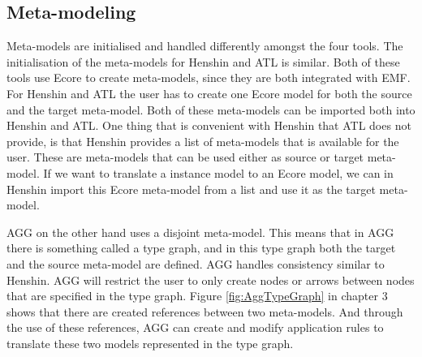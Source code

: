 \subsection{Meta-modeling}

Meta-models are initialised and handled differently amongst the four tools.
The initialisation of the meta-models for Henshin and ATL is similar. Both of
these tools use Ecore to create meta-models, since they are both integrated with
EMF. For Henshin and ATL the user has to create one Ecore model for both the
source and the target meta-model. Both of these meta-models can be imported both
into Henshin and ATL. One thing that is convenient with Henshin that ATL does
not provide, is that Henshin provides a list of meta-models that is available
for the user. These are meta-models that can be used either as source or target
meta-model. If we want to translate a instance model to an Ecore model, we can
in Henshin import this Ecore meta-model from a list and use it as the target
meta-model.

AGG on the other hand uses a disjoint meta-model. This means that in AGG there
is something called a type graph, and in this type graph both the target and
the source meta-model are defined. AGG handles consistency similar to
Henshin. AGG will restrict the user to only create nodes or arrows between
nodes that are specified in the type graph. Figure \ref{fig:AggTypeGraph}
in chapter 3 shows that there are created references between two meta-models. And
through the use of these references, AGG can create and modify application
rules to translate these two models represented in the type graph. 

